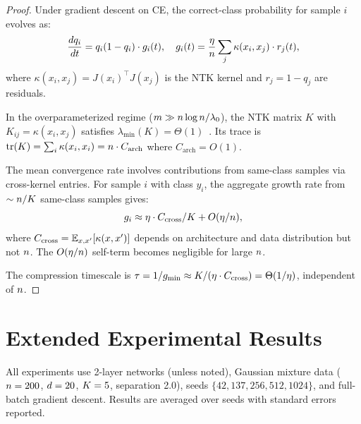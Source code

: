 \begin{proof}
Under gradient descent on CE, the correct-class probability for sample $i$ evolves as:
\begin{equation}
    \frac{dq_i}{dt} = q_i(1-q_i)\cdot g_i(t), \quad g_i(t) = \frac{\eta}{n}\sum_j \kappa(x_i,x_j)\cdot r_j(t),
\end{equation}
where $\kappa(x_i,x_j) = J(x_i)^\top J(x_j)$ is the NTK kernel and $r_j = 1-q_j$ are residuals.

In the overparameterized regime ($m \gg n\log n/\lambda_0$), the NTK matrix $K$ with $K_{ij} = \kappa(x_i,x_j)$ satisfies $\lambda_{\min}(K) = \Theta(1)$~\citep{du2019gradient,jacot2018neural}. Its trace is $\operatorname{tr}(K) = \sum_i \kappa(x_i,x_i) = n \cdot C_{\text{arch}}$ where $C_{\text{arch}} = O(1)$.

The mean convergence rate involves contributions from same-class samples via cross-kernel entries. For sample $i$ with class $y_i$, the aggregate growth rate from $\sim n/K$ same-class samples gives:
\begin{equation}
    g_i \approx \eta \cdot C_{\text{cross}}/K + O(\eta/n),
\end{equation}
where $C_{\text{cross}} = \mathbb{E}_{x,x'}[\kappa(x,x')]$ depends on architecture and data distribution but not $n$. The $O(\eta/n)$ self-term becomes negligible for large $n$.

The compression timescale is $\tau = 1/g_{\min} \approx K/(\eta \cdot C_{\text{cross}}) = \Theta(1/\eta)$, independent of $n$.
\end{proof}

\section{Extended Experimental Results}
\label{app:experiments}

All experiments use 2-layer networks (unless noted), Gaussian mixture data ($n=200$, $d=20$, $K=5$, separation 2.0), seeds $\{42, 137, 256, 512, 1024\}$, and full-batch gradient descent. Results are averaged over seeds with standard errors reported.

